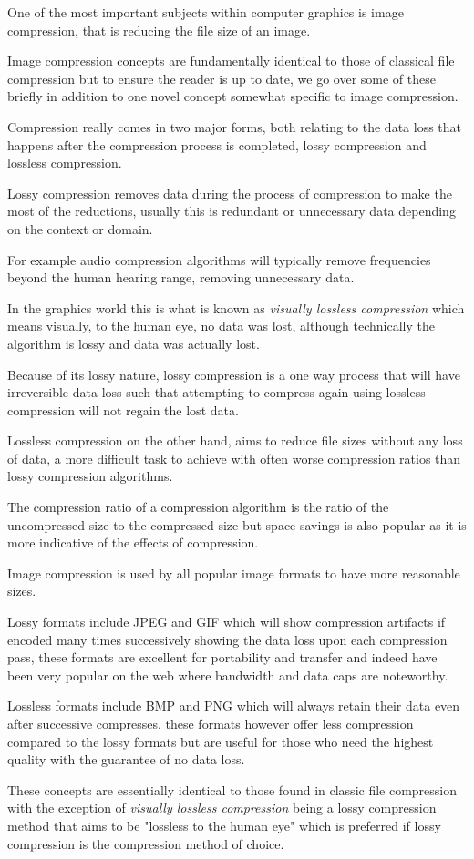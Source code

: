 \documentclass[12pt]{article}
\newcommand{\sentence}{} %
\newcommand{\italic}[1]{\textit{#1}}
\begin{document}
    \tab
    One of the most important subjects within computer graphics is image compression, that is reducing the file size
    of an image.
    \sentence
    Image compression concepts are fundamentally identical to those of classical file compression but to ensure the
    reader is up to date, we go over some of these briefly in addition to one novel concept somewhat specific to
    image compression.
    \sentence
    Compression really comes in two major forms, both relating to the data loss that happens after the compression
    process is completed, lossy compression and lossless compression.
    \sentence
    Lossy compression removes data during the process of compression to make the most of the reductions, usually
    this is redundant or unnecessary data depending on the context or domain.
    \sentence
    For example audio compression algorithms will typically remove frequencies beyond the human hearing range,
    removing unnecessary data.
    \sentence
    In the graphics world this is what is known as \italic{visually lossless compression} which means visually, to
    the human eye, no data was lost, although technically the algorithm is lossy and data was actually lost.
    \sentence
    Because of its lossy nature, lossy compression is a one way process that will have irreversible data loss such
    that attempting to compress again using lossless compression will not regain the lost data.
    \sentence
    Lossless compression on the other hand, aims to reduce file sizes without any loss of data, a more difficult task
    to achieve with often worse compression ratios than lossy compression algorithms.
    \sentence
    The compression ratio of a compression algorithm is the ratio of the uncompressed size to the compressed size but
    space savings is also popular as it is more indicative of the effects of compression.
    \sentence

    \bigskip
    Image compression is used by all popular image formats to have more reasonable sizes.
    \sentence
    Lossy formats include JPEG and GIF which will show compression artifacts if encoded many times successively
    showing the data loss upon each compression pass, these formats are excellent for portability and transfer and
    indeed have been very popular on the web where bandwidth and data caps are noteworthy.
    \sentence
    Lossless formats include BMP and PNG which will always retain their data even after successive compresses, these
    formats however offer less compression compared to the lossy formats but are useful for those who need the
    highest quality with the guarantee of no data loss.
    \sentence
    These concepts are essentially identical to those found in classic file compression with the exception of
    \italic{visually lossless compression} being a lossy compression method that aims to be "lossless to the human
    eye" which is preferred if lossy compression is the compression method of choice.
\end{document}
